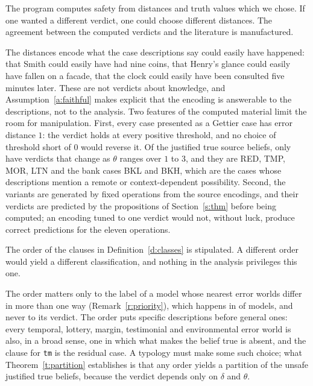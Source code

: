 \documentclass{situationist-preprint}
\begin{document}
\begin{objection}\label{o:encode}
The program computes safety from distances and truth values which we chose. If one wanted a different verdict, one could choose different distances. The agreement between the computed verdicts and the literature is manufactured.
\end{objection}

\begin{reply}
The distances encode what the case descriptions say could easily have happened: that Smith could easily have had nine coins, that Henry's glance could easily have fallen on a facade, that the clock could easily have been consulted five minutes later. These are not verdicts about knowledge, and Assumption~\ref{a:faithful} makes explicit that the encoding is answerable to the descriptions, not to the analysis. Two features of the computed material limit the room for manipulation. First, every case presented as a Gettier case has error distance $1$: the verdict holds at every positive threshold, and no choice of threshold short of $0$ would reverse it. Of the \stnjtsrc{} justified true source beliefs, only \stnnonrobust{} have verdicts that change as $\theta$ ranges over $1$ to $3$, and they are RED, TMP, MOR, LTN and the bank cases BKL and BKH, which are the cases whose descriptions mention a remote or context-dependent possibility. Second, the variants are generated by fixed operations from the source encodings, and their verdicts are predicted by the propositions of Section~\ref{s:thm} before being computed; an encoding tuned to one verdict would not, without luck, produce correct predictions for the eleven operations.
\end{reply}

\begin{objection}\label{o:arbitrary}
The order of the clauses in Definition~\ref{d:classes} is stipulated. A different order would yield a different classification, and nothing in the analysis privileges this one.
\end{objection}

\begin{reply}
The order matters only to the label of a model whose nearest error worlds differ in more than one way (Remark~\ref{r:priority}), which happens in \stnmulti{} of \stnmodels{} models, and never to its verdict. The order puts specific descriptions before general ones: every temporal, lottery, margin, testimonial and environmental error world is also, in a broad sense, one in which what makes the belief true is absent, and the clause for \texttt{tm} is the residual case. A typology must make some such choice; what Theorem~\ref{t:partition} establishes is that any order yields a partition of the unsafe justified true beliefs, because the verdict depends only on $\delta$ and $\theta$.
\end{reply}
\end{document}
